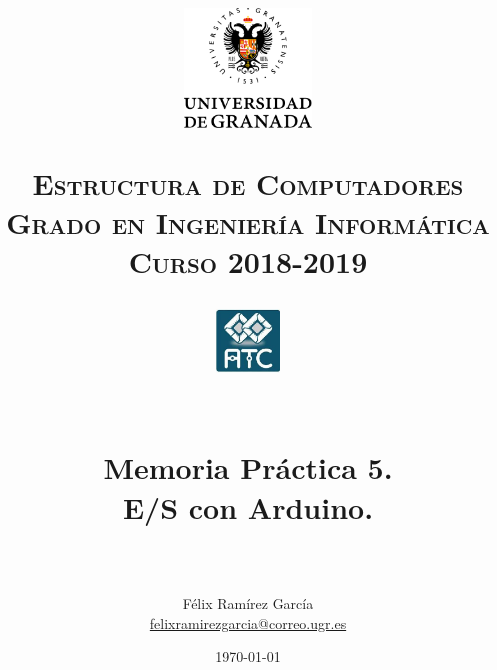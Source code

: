 
\usepackage{url}


\title{	
	\normalfont \normalsize
	\begin{figure}[htb]
		\centering
		\includegraphics[width=0.3\textwidth]{./imagenes/1}
	\end{figure}
	\textsc{\textbf{Estructura de Computadores} \\ Grado en Ingeniería Informática \\ 
	Curso 2018-2019} \\ [25pt] %
	\begin{figure}[htb]
		\centering
		\includegraphics[width=0.15\textwidth]{./imagenes/2}
	\end{figure}
	\horrule{0.5pt} \\[0.4cm] %
	\huge Memoria Práctica 5. \\
	\huge E/S con Arduino.
	\\ %
	\horrule{2pt} \\[0.5cm] %
}
\author{Félix Ramírez García  \\
\href{mailto:felixramirezgarcia@correo.ugr.es}{felixramirezgarcia@correo.ugr.es}} %
\date{\normalsize\today} %



	
	\maketitle %
	
	\newpage %
	
